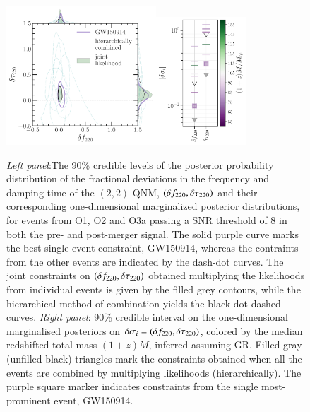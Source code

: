 \begin{figure}
        \includegraphics[width=0.5\textwidth]{figures/rin_pseob_results_v2.pdf}\includegraphics[width=0.3\textwidth]{figures/rin_all_events_bounds.pdf}
        \caption{\emph{Left panel}:The 90\% credible levels of the posterior probability distribution of the fractional deviations in the frequency and damping time of the $(2, 2)$ QNM, $(\delta f_{\text{220}},\delta \tau_{\text{220}})$ and their corresponding one-dimensional marginalized posterior distributions, for events from O1, O2 and O3a passing a SNR threshold of $8$ in both the pre- and post-merger signal. The solid purple curve marks the best single-event constraint, GW150914, whereas the contraints from the other events are indicated by the dash-dot curves. The joint constraints on $(\delta f_{\text{220}},\delta \tau_{\text{220}})$ obtained multiplying the likelihoods from individual events is given by the filled grey contours, while the hierarchical method of combination yields the black dot dashed curves. \emph{Right panel}: 90\% credible interval on the one-dimensional marginalised posteriors on $\delta \sigma_i=(\delta f_{\text{220}},\delta \tau_{\text{220}})$, colored by the median redshifted total mass $(1 + z)M$, inferred assuming GR. Filled gray (unfilled black) triangles mark the constraints obtained when all the events are combined by multiplying likelihoods (hierarchically). The purple square marker indicates constraints from the single most-prominent event, GW150914.}
        \label{fig:o1o2_events}
\end{figure}



